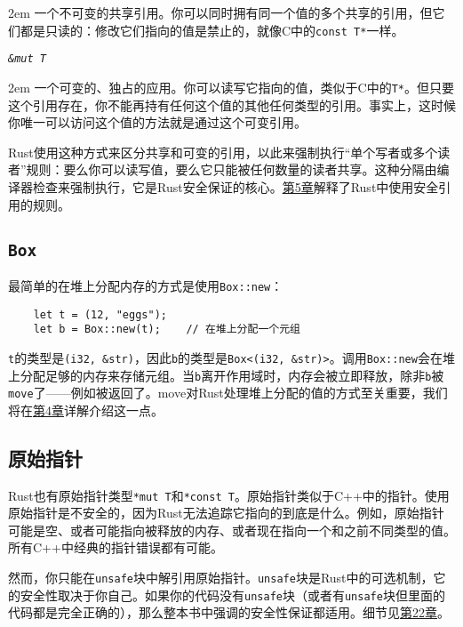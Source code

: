 \hangindent 2em
\noindent
一个不可变的共享引用。你可以同时拥有同一个值的多个共享的引用，但它们都是只读的：修改它们指向的值是禁止的，就像C中的\texttt{const T*}一样。

\begin{flushleft}
    \emph{\texttt{\&mut T}}
\end{flushleft}

\hangindent 2em
\noindent
一个可变的、独占的应用。你可以读写它指向的值，类似于C中的\texttt{T*}。但只要这个引用存在，你不能再持有任何这个值的其他任何类型的引用。事实上，这时候你唯一可以访问这个值的方法就是通过这个可变引用。

Rust使用这种方式来区分共享和可变的引用，以此来强制执行“单个写者或多个读者”规则：要么你可以读写值，要么它只能被任何数量的读者共享。这种分隔由编译器检查来强制执行，它是Rust安全保证的核心。\hyperref[ch05]{第5章}解释了Rust中使用安全引用的规则。

\subsection{\texttt{Box}}

最简单的在堆上分配内存的方式是使用\texttt{Box::new}：
\begin{verbatim}
    let t = (12, "eggs");
    let b = Box::new(t);    // 在堆上分配一个元组
\end{verbatim}

\texttt{t}的类型是\texttt{(i32, \&str)}，因此\texttt{b}的类型是\texttt{Box<(i32, \&str)>}。调用\texttt{Box::new}会在堆上分配足够的内存来存储元组。当\texttt{b}离开作用域时，内存会被立即释放，除非\texttt{b}被\texttt{move}了——例如被返回了。move对Rust处理堆上分配的值的方式至关重要，我们将在\hyperref[ch04]{第4章}详解介绍这一点。

\subsection{原始指针}

Rust也有原始指针类型\texttt{*mut T}和\texttt{*const T}。原始指针类似于C++中的指针。使用原始指针是不安全的，因为Rust无法追踪它指向的到底是什么。例如，原始指针可能是空、或者可能指向被释放的内存、或者现在指向一个和之前不同类型的值。所有C++中经典的指针错误都有可能。

然而，你只能在\texttt{unsafe}块中解引用原始指针。\texttt{unsafe}块是Rust中的可选机制，它的安全性取决于你自己。如果你的代码没有\texttt{unsafe}块（或者有\texttt{unsafe}块但里面的代码都是完全正确的），那么整本书中强调的安全性保证都适用。细节见\hyperref[ch22]{第22章}。

